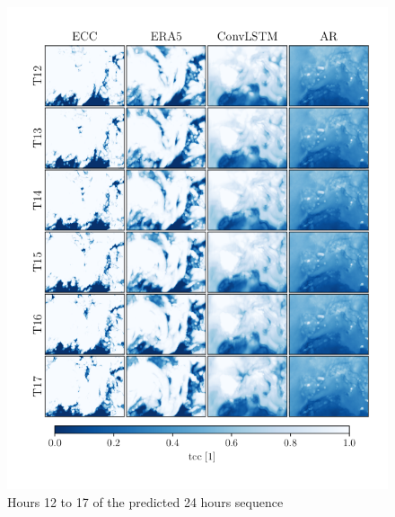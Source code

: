 \begin{figure}
    \centering
    \includegraphics{python_figs/comparing_seq_part_3_of4_jan2.png}
    \caption{Hours 12 to 17 of the  predicted 24 hours sequence }
    \label{fig:part3/4}
\end{figure}
